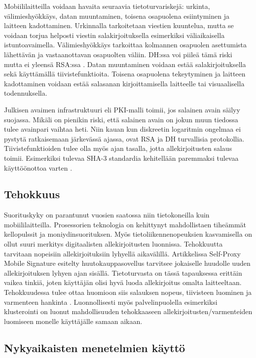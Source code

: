 \documentclass[finnish]{tktltiki2}
\theoremstyle{definition}
\theoremstyle{remark}
\begin{document}
Mobiililaitteilla voidaan havaita seuraavia tietoturvariskejä: urkinta, välimieshyökkäys, datan muuntaminen, toisena osapuolena esiintyminen ja laitteen kadottaminen. Urkinnalla tarkoitetaan viestien kuuntelua, mutta se voidaan torjua helposti viestin salakirjoituksella esimerkiksi väliaikaisella istuntoavaimella. Välimieshyökkäys tarkoittaa kolmannen osapuolen asettumista lähettävän ja vastaanottavan osapuolten väliin. DH:ssa voi piileä tämä riski mutta ei yleensä RSA:ssa \cite{enti}. Datan muuntaminen voidaan estää salakirjoituksella sekä käyttämällä tiivistefunktioita. Toisena osapuolena tekeytyminen ja laitteen kadottaminen voidaan estää salasanan kirjoittamisella laitteelle tai visuaalisella todennuksella. 

Julkisen avaimen infrastruktuuri eli PKI-malli toimii, jos salainen avain säilyy suojassa. Mikäli on pienikin riski, että salainen avain on jokun muun tiedossa tulee avainpari vaihtaa heti. Niin kauan kun diskreetin logaritmin ongelmaa ei pystytä ratkaisemaan järkevässä ajassa, ovat RSA ja DH turvallisia protokollia. Tiivistefunktioiden tulee olla myös ajan tasalla, jotta allekirjoitusten salaus toimii. Esimerkiksi tulevaa SHA-3 standardia kehitellään paremmaksi tulevaa käyttöönottoa varten \cite{nist}.
	  

\subsection{Tehokkuus}

Suorituskyky on parantunut vuosien saatossa niin tietokoneilla kuin mobiililaitteilla. Prosessorien teknologia on kehittynyt mahdollistaen tiheämmät kellopulssit ja moniydinsuorituksen. Myös tietoliikennenopeuksien kasvamisella on ollut suuri merkitys digitaalisten allekirjoitusten luonnissa. Tehokkuutta tarvitaan nopeisiin allekirjoituksiin lyhyellä aikavälillä. Artikkelissa Self-Proxy Mobile Signature \cite{proxy} esitelty huutokauppasovellus tarvitsee jokaiselle huudolle uuden  allekirjoituksen lyhyen ajan sisällä. Tietoturvasta on tässä tapauksessa erittäin vaikea tinkiä, joten käyttäjän olisi hyvä luoda allekirjoitus omalta laitteeltaan. Tehokkuudessa tulee ottaa huomioon siis salauksen nopeus, tiivisteen luominen ja varmenteen hankinta \cite{proxy}. Luonnollisesti myös palvelinpuolella esimerkiksi klusterointi on luonut mahdollisuuden tehokkaaseen allekirjoitusten/varmenteiden luomiseen monelle käyttäjälle samaan aikaan.

\subsection{Nykyaikaisten menetelmien käyttö}
\end{document}

